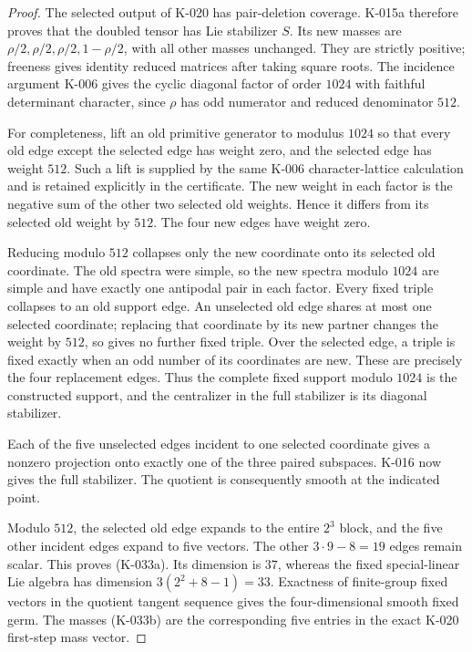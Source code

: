 \begin{proof}
The selected output of K-020 has pair-deletion coverage.  K-015a
therefore proves that the doubled tensor has Lie stabilizer $S$.
Its new masses are $\rho/2,\rho/2,\rho/2,1-\rho/2$, with all other
masses unchanged.  They are strictly positive; freeness gives
identity reduced matrices after taking square roots.  The incidence
argument K-006 gives the cyclic diagonal factor of order $1024$
with faithful determinant character, since $\rho$ has odd numerator
and reduced denominator $512$.

For completeness, lift an old primitive generator to modulus $1024$
so that every old edge except the selected edge has weight zero,
and the selected edge has weight $512$.  Such a lift is supplied
by the same K-006 character-lattice calculation and is retained
explicitly in the certificate.  The new weight in each factor is
the negative sum of the other two selected old weights.  Hence
it differs from its selected old weight by $512$.  The four new
edges have weight zero.

Reducing modulo $512$ collapses only the new coordinate onto its
selected old coordinate.  The old spectra were simple, so the
new spectra modulo $1024$ are simple and have exactly one
antipodal pair in each factor.  Every fixed triple collapses to
an old support edge.  An unselected old edge shares at most one
selected coordinate; replacing that coordinate by its new partner
changes the weight by $512$, so gives no further fixed triple.
Over the selected edge, a triple is fixed exactly when an odd
number of its coordinates are new.  These are precisely the four
replacement edges.  Thus the complete fixed support modulo
$1024$ is the constructed support, and the centralizer in the
full stabilizer is its diagonal stabilizer.

Each of the five unselected edges incident to one selected
coordinate gives a nonzero projection onto exactly one of the
three paired subspaces.  K-016 now gives the full stabilizer.
The quotient is consequently smooth at the indicated point.

Modulo $512$, the selected old edge expands to the entire $2^3$
block, and the five other incident edges expand to five vectors.
The other $3\cdot9-8=19$ edges remain scalar.  This proves
(K-033a).  Its dimension is $37$, whereas the fixed
special-linear Lie algebra has dimension
$3(2^2+8-1)=33$.  Exactness of finite-group fixed vectors in the
quotient tangent sequence gives the four-dimensional smooth fixed
germ.  The masses (K-033b) are the corresponding five entries in
the exact K-020 first-step mass vector.
\end{proof}

